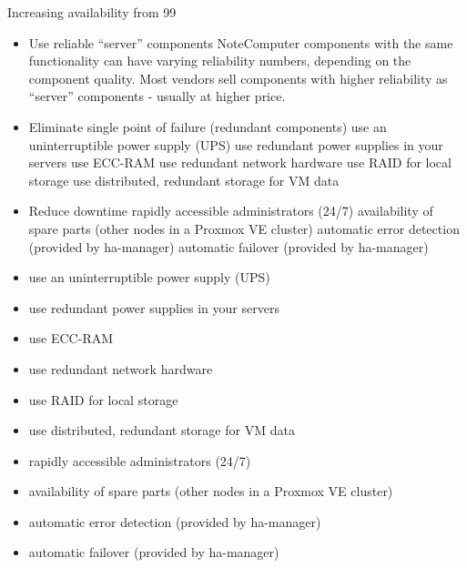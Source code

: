 Increasing availability from 99%

\begin{itemize}[leftmargin=2cm]

	\item Use reliable “server” components NoteComputer components with the same functionality can have varying reliability numbers, depending on the component quality. Most vendors sell components with higher reliability as “server” components - usually at higher price.

	\item Eliminate single point of failure (redundant components) use an uninterruptible power supply (UPS) use redundant power supplies in your servers use ECC-RAM use redundant network hardware use RAID for local storage use distributed, redundant storage for VM data

	\item Reduce downtime rapidly accessible administrators (24/7) availability of spare parts (other nodes in a Proxmox VE cluster) automatic error detection (provided by ha-manager) automatic failover (provided by ha-manager)

\end{itemize}

\begin{itemize}[leftmargin=2cm]

	\item use an uninterruptible power supply (UPS)

	\item use redundant power supplies in your servers

	\item use ECC-RAM

	\item use redundant network hardware

	\item use RAID for local storage

	\item use distributed, redundant storage for VM data

\end{itemize}

\begin{itemize}[leftmargin=2cm]

	\item rapidly accessible administrators (24/7)

	\item availability of spare parts (other nodes in a Proxmox VE cluster)

	\item automatic error detection (provided by ha-manager)

	\item automatic failover (provided by ha-manager)

\end{itemize}

